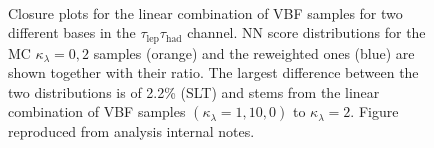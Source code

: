 \begin{figure}[tbh!]
   \
   \caption{Closure plots for the linear combination of VBF samples for 
   two different bases in the $\tau_{\text{lep}}\tau_{\text{had}}$ channel. 
   NN score distributions for the MC $\kappa_\lambda = 0, 2$ samples (orange) and the 
   reweighted ones (blue) are shown together with their ratio. 
   The largest difference between the two distributions is of 2.2\% (SLT) and 
   stems from the linear combination of VBF samples $(\kappa_\lambda = 1, 10, 0)$ to  $\kappa_\lambda=2$.
   Figure reproduced from analysis internal notes.}
   \label{fig:bbtautau_lephad_VBFclosure}
\end{figure}


















